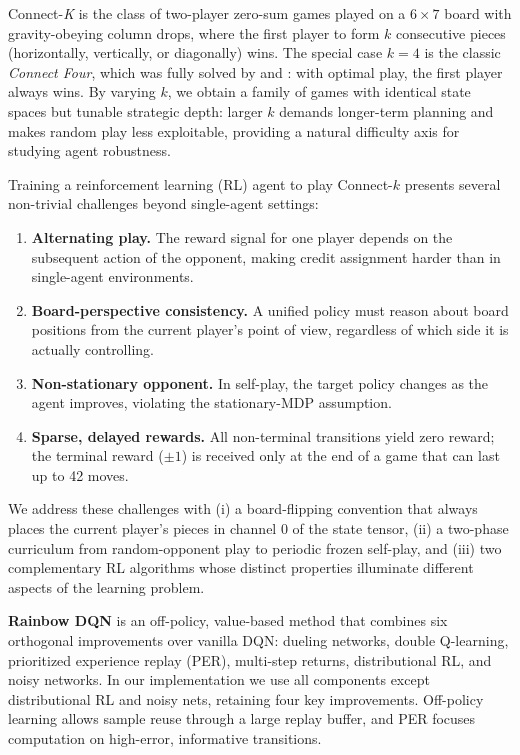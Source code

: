 \documentclass[10pt, letterpaper, twocolumn]{article}
\begin{document}
Connect-\textit{K} is the class of two-player zero-sum games played on a
$6{\times}7$ board with gravity-obeying column drops, where the first
player to form $k$ consecutive pieces (horizontally, vertically, or
diagonally) wins.  The special case $k{=}4$ is the classic
\emph{Connect Four}, which was fully solved by \citet{tromp1995connectfour}
and \citet{allis1994connect4}: with optimal play, the first player
always wins.  By varying $k$, we obtain a family of games with identical
state spaces but tunable strategic depth: larger $k$ demands longer-term
planning and makes random play less exploitable, providing a natural
difficulty axis for studying agent robustness.

Training a reinforcement learning (RL) agent to play Connect-$k$ presents
several non-trivial challenges beyond single-agent settings:
\begin{enumerate}
  \item \textbf{Alternating play.}  The reward signal for one player
  depends on the subsequent action of the opponent, making credit
  assignment harder than in single-agent environments.
  \item \textbf{Board-perspective consistency.}  A unified policy must
  reason about board positions from the current player's point of view,
  regardless of which side it is actually controlling.
  \item \textbf{Non-stationary opponent.}  In self-play, the target
  policy changes as the agent improves, violating the stationary-MDP
  assumption.
  \item \textbf{Sparse, delayed rewards.}  All non-terminal transitions
  yield zero reward; the terminal reward ($\pm 1$) is received only at
  the end of a game that can last up to 42 moves.
\end{enumerate}

We address these challenges with (i) a board-flipping convention that
always places the current player's pieces in channel 0 of the state
tensor, (ii) a two-phase curriculum from random-opponent play to
periodic frozen self-play, and (iii) two complementary RL algorithms
whose distinct properties illuminate different aspects of the learning
problem.

\textbf{Rainbow DQN} \citep{hessel2018rainbow} is an off-policy,
value-based method that combines six orthogonal improvements over
vanilla DQN: dueling networks, double Q-learning, prioritized experience
replay (PER), multi-step returns, distributional RL, and noisy
networks.  In our implementation we use all components except
distributional RL and noisy nets, retaining four key improvements.
Off-policy learning allows sample reuse through a large replay buffer,
and PER focuses computation on high-error, informative transitions.
\end{document}
